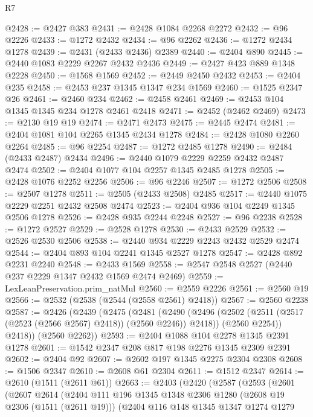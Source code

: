\begin{lexlean}{R7}
\begin{coremodule}
@2428 := @2427 @383
@2431 := @2428 @1084 @2268 @2272
@2432 := @96 @2226
@2433 := @1272 @2432
@2434 := @96 @2262
@2436 := @1272 @2434 @1278
@2439 := @2431 (@2433 @2436) @2389
@2440 := @2404 @890
@2445 := @2440 @1083 @2229 @2267 @2432 @2436
@2449 := @2427 @423 @889 @1348 @2228
@2450 := @1568 @1569
@2452 := @2449 @2450 @2432
@2453 := @2404 @235
@2458 := @2453 @237 @1345 @1347 @234 @1569
@2460 := @1525 @2347 @26
@2461 := @2460 @234
@2462 := @2458 @2461
@2469 := @2453 @104 @1345 @1345 @234 @1278 @2461 @2418
@2471 := @2452 (@2462 @2469)
@2473 := @2130 @19 @19
@2474 := @2471 @2473
@2475 := @2445 @2474
@2481 := @2404 @1081 @104 @2265 @1345 @2434 @1278
@2484 := @2428 @1080 @2260 @2264
@2485 := @96 @2254
@2487 := @1272 @2485 @1278
@2490 := @2484 (@2433 @2487) @2434
@2496 := @2440 @1079 @2229 @2259 @2432 @2487 @2474
@2502 := @2404 @1077 @104 @2257 @1345 @2485 @1278
@2505 := @2428 @1076 @2252 @2256
@2506 := @96 @2246
@2507 := @1272 @2506
@2508 := @2507 @1278
@2511 := @2505 (@2433 @2508) @2485
@2517 := @2440 @1075 @2229 @2251 @2432 @2508 @2474
@2523 := @2404 @936 @104 @2249 @1345 @2506 @1278
@2526 := @2428 @935 @2244 @2248
@2527 := @96 @2238
@2528 := @1272 @2527
@2529 := @2528 @1278
@2530 := @2433 @2529
@2532 := @2526 @2530 @2506
@2538 := @2440 @934 @2229 @2243 @2432 @2529 @2474
@2544 := @2404 @893 @104 @2241 @1345 @2527 @1278
@2547 := @2428 @892 @2231 @2240
@2548 := @2433 @1569
@2558 := @2547 @2548 @2527 (@2440 @237 @2229 @1347 @2432 @1569 @2474 @2469)
@2559 := LexLeanPreservation.prim_natMul
@2560 := @2559 @2226
@2561 := @2560 @19
@2566 := @2532 (@2538 (@2544 (@2558 @2561) @2418))
@2567 := @2560 @2238
@2587 := @2426
    (@2439
      (@2475
        (@2481
          (@2490
            (@2496 (@2502 (@2511 (@2517 (@2523 (@2566 @2567) @2418)) (@2560 @2246)) @2418))
            (@2560 @2254))
          @2418))
      (@2560 @2262))
@2593 := @2404 @1088 @104 @2278 @1345 @2391 @1278
@2601 := @1542 @2347 @208 @817 @198 @2276 @1345 @2309 @2391
@2602 := @2404 @92
@2607 := @2602 @197 @1345 @2275 @2304 @2308
@2608 := @1506 @2347
@2610 := @2608 @61 @2304
@2611 := @1512 @2347
@2614 := @2610 (@1511 (@2611 @61))
@2663 := @2403
    (@2420
      (@2587
        (@2593
          (@2601
            (@2607
              @2614
              (@2404
                @111
                @196
                @1345
                @1348
                @2306
                @1280
                (@2608 @19 @2306 (@1511 (@2611 @19)))
                (@2404
                  @116
                  @148
                  @1345
                  @1347
                  @1274
                  @1279

\end{coremodule}
\end{lexlean}
